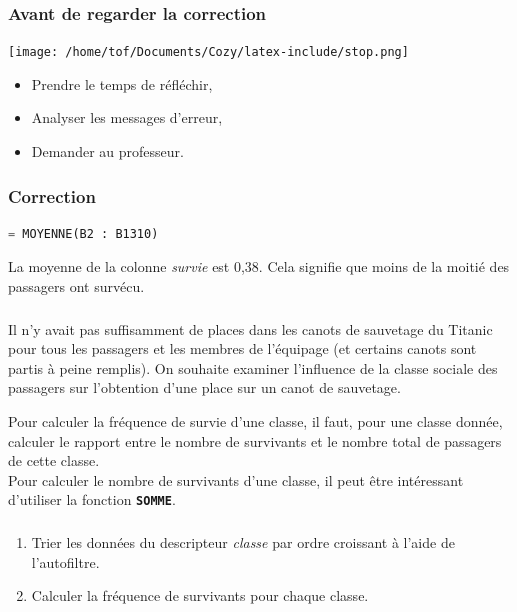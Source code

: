 \documentclass[svgnames,11pt]{beamer}
\begin{document}
\begin{frame}
    \frametitle{Avant de regarder la correction}
\begin{center}
    \centering
    \texttt{[image: /home/tof/Documents/Cozy/latex-include/stop.png]}
    \end{center}
{\Large
    \begin{itemize}
        \item Prendre le temps de réfléchir,
        \item Analyser les messages d'erreur,
        \item Demander au professeur.
    \end{itemize}
}
\end{frame}
\begin{frame}[fragile]
    \frametitle{Correction}

    \begin{center}
        \begin{lstlisting}[language=Python , basicstyle=\small, xleftmargin=2em, xrightmargin=2em]
= MOYENNE(B2 : B1310)
\end{lstlisting}
        \label{age}
        \end{center}
    La moyenne de la colonne \emph{survie} est 0,38. Cela signifie que moins de la moitié des passagers ont survécu.

\end{frame}
\begin{frame}
    \frametitle{}
    Il n’y avait pas suffisamment de places dans les canots de sauvetage du Titanic pour tous les passagers et les membres de l’équipage (et certains canots sont partis à peine remplis). On souhaite examiner l’influence de la classe sociale des passagers sur l’obtention d’une place sur un canot de sauvetage.

    Pour calculer la fréquence de survie d'une classe, il faut, pour une classe donnée, calculer le rapport entre le nombre de survivants et le nombre total de passagers de cette classe.\\
    Pour calculer le nombre de survivants d'une classe, il peut être intéressant d'utiliser la fonction \textbf{\texttt{SOMME}}.
    

\end{frame}
\begin{frame}
    \frametitle{}

    \begin{activite}
        \begin{enumerate}
            \item Trier les données du descripteur \emph{classe} par ordre croissant à l’aide de l’autofiltre.
            \item Calculer la fréquence de survivants pour chaque classe.
        \end{enumerate}
        \end{activite}

\end{frame}
\end{document}
